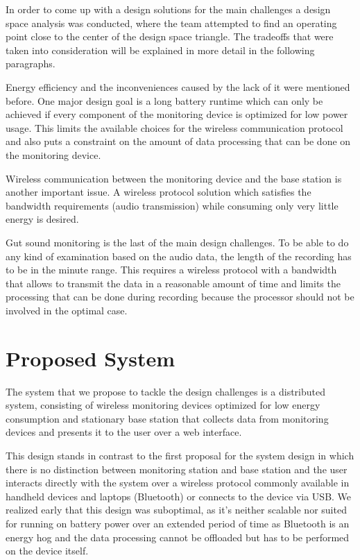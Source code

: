 In order to come up with a design solutions for the main challenges a design space analysis was conducted, where the team attempted to find an operating point close to the center of the design space triangle. The tradeoffs that were taken into consideration will be explained in more detail in the following paragraphs.  

Energy efficiency and the inconveniences caused by the lack of it were mentioned before. One major design goal is a long battery runtime which can only be achieved if every component of the monitoring device is optimized for low power usage. This limits the available choices for the wireless communication protocol and also puts a constraint on the amount of data processing that can be done on the monitoring device.
 
Wireless communication between the monitoring device and the base station is another important issue. A wireless protocol solution which satisfies the bandwidth requirements (audio transmission) while consuming only very little energy is desired. 

Gut sound monitoring is the last of the main design challenges. To be able to do any kind of examination based on the audio data, the length of the recording has to be in the minute range. This requires a wireless protocol with a bandwidth that allows to transmit the data in a reasonable amount of time and limits the processing that can be done during recording because the processor should not be involved in the optimal case.

\section{Proposed System}
The system that we propose to tackle the design challenges is a distributed system, consisting of wireless monitoring devices optimized for low energy consumption and stationary base station that collects data from monitoring devices and presents it to the user over a web interface. 

This design stands in contrast to the first proposal for the system design in which there is no distinction between monitoring station and base station and the user interacts directly with the system over a wireless protocol commonly available in handheld devices and laptops (Bluetooth) or connects to the device via USB. We realized early that this design was suboptimal, as it’s neither scalable nor suited for running on battery power over an extended period of time as Bluetooth is an energy hog and the data processing cannot be offloaded but has to be performed on the device itself.

